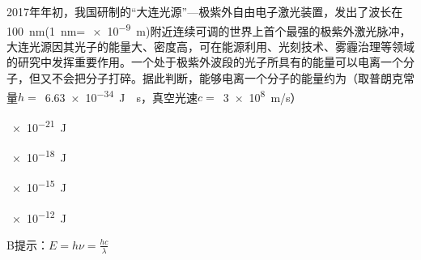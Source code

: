 2017年年初，我国研制的“大连光源”—极紫外自由电子激光装置，发出了波长在\qty{100}{nm}(\qty{1}{nm}=\,\qty{e-9}{m})附近连续可调的世界上首个最强的极紫外激光脉冲，大连光源因其光子的能量大、密度高，可在能源利用、光刻技术、雾霾治理等领域的研究中发挥重要作用。一个处于极紫外波段的光子所具有的能量可以电离一个分子，但又不会把分子打碎。据此判断，能够电离一个分子的能量约为（取普朗克常量\(h =\) \,\qty{6.63e-34}{J\cdot s}，真空光速\(c =\) \,\qty{3e8}{m/s}）\paren[B]
\begin{choices}
	\item \qty{e-21}{J}
	\item \qty{e-18}{J}
	\item \qty{e-15}{J}
	\item \qty{e-12}{J}
\end{choices}
\begin{answer}
	B\qquad 提示：\(E = h\nu = \frac{hc}{\lambda}\)
\end{answer}